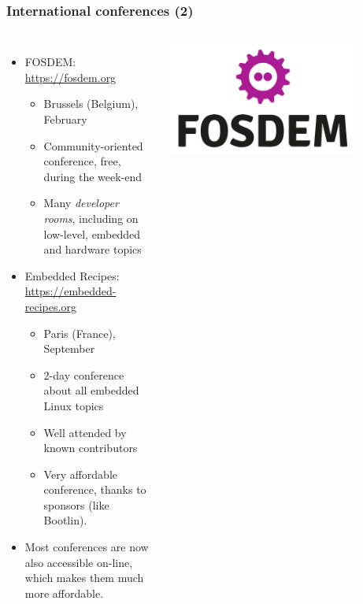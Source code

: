 \begin{frame}
  \frametitle{International conferences (2)}
  \begin{columns}
  \begin{itemize}
  \item FOSDEM: \url{https://fosdem.org}
    \begin{itemize}
    \item Brussels (Belgium), February
    \item Community-oriented conference, free, during the week-end
    \item Many {\em developer rooms}, including on low-level, embedded
      and hardware topics
    \end{itemize}
  \item Embedded Recipes: \url{https://embedded-recipes.org}
    \begin{itemize}
    \item Paris (France), September
    \item 2-day conference about all embedded Linux topics
    \item Well attended by known contributors
    \item Very affordable conference, thanks to sponsors (like Bootlin).
    \end{itemize}
  \item Most conferences are now also accessible on-line, which makes
    them much more affordable.
  \end{itemize}
    \begin{center}
      \includegraphics[width=0.8\textwidth]{slides/sysdev-references/fosdem.jpg}\\
      \vspace{1cm}

\end{center}
\end{columns}
\end{frame}
